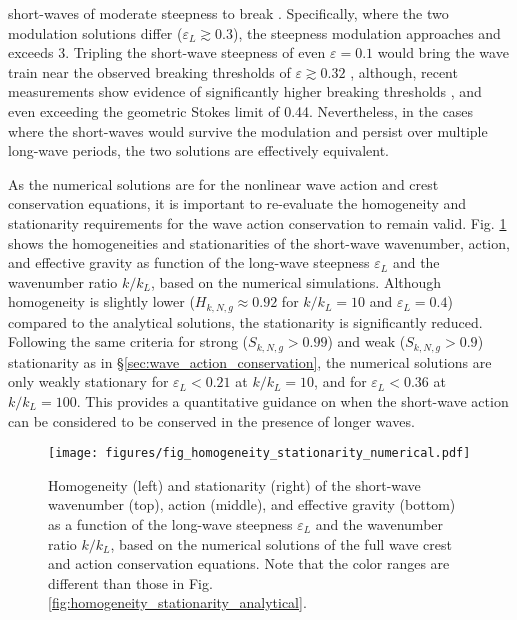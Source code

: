 \documentclass[lineno]{jfm}
\begin{document}
short-waves of moderate steepness to break \citep{banner1993wave}.
Specifically, where the two modulation solutions differ ($\varepsilon_L \gtrsim 0.3$),
the steepness modulation approaches and exceeds 3.
Tripling the short-wave steepness of even $\varepsilon = 0.1$ would bring the
wave train near the observed breaking thresholds of $\varepsilon \gtrsim 0.32$
\citep{perlin2013breaking}, although, recent measurements show evidence of
significantly higher breaking thresholds
\citep{toffoli2010maximum,mcallister2024three}, and even exceeding the
geometric Stokes limit of 0.44.
Nevertheless, in the cases where the short-waves would survive the
modulation and persist over multiple long-wave periods, the two solutions are
effectively equivalent.

As the numerical solutions are for the nonlinear wave action and crest conservation
equations, it is important to re-evaluate the homogeneity and stationarity
requirements for the wave action conservation to remain valid.
Fig. \ref{fig:homogeneity_stationarity_numerical} shows the homogeneities
and stationarities of the short-wave wavenumber, action, and effective gravity
as function of the long-wave steepness $\varepsilon_L$ and the wavenumber ratio
$k/k_L$, based on the numerical simulations.
Although homogeneity is slightly lower ($H_{k,N,g} \approx 0.92$ for $k/k_L = 10$
and $\varepsilon_L = 0.4$) compared to the analytical solutions,
the stationarity is significantly reduced.
Following the same criteria for strong ($S_{k,N,g} > 0.99$) and weak
($S_{k,N,g} > 0.9$) stationarity as in \S\ref{sec:wave_action_conservation},
the numerical solutions are only weakly stationary for $\varepsilon_L < 0.21$
at $k/k_L = 10$, and for $\varepsilon_L < 0.36$ at $k/k_L = 100$.
This provides a quantitative guidance on when the short-wave action can be
considered to be conserved in the presence of longer waves.

\begin{figure}
\centering
\texttt{[image: figures/fig\_homogeneity\_stationarity\_numerical.pdf]}
\caption{
Homogeneity (left) and stationarity (right) of the short-wave wavenumber (top),
action (middle), and effective gravity (bottom) as a function of the long-wave
steepness $\varepsilon_L$ and the wavenumber ratio $k/k_L$, based on the
numerical solutions of the full wave crest and action conservation equations.
Note that the color ranges are different than those in Fig. \ref{fig:homogeneity_stationarity_analytical}.
}
\label{fig:homogeneity_stationarity_numerical}
\end{figure}
\end{document}

